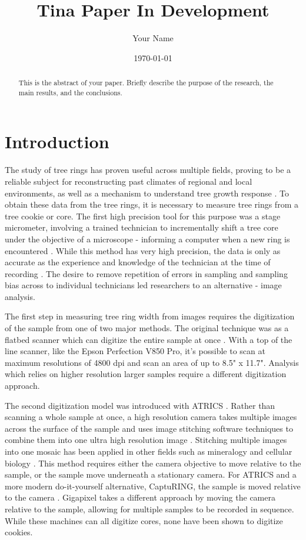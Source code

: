 \documentclass[a4paper,12pt]{article}
\title{Tina Paper In Development}
\author{Your Name}
\date{\today}
\begin{document}
\maketitle

\begin{abstract}
    This is the abstract of your paper. Briefly describe the purpose of the research, the main results, and the conclusions.
\end{abstract}

\section{Introduction}
The study of tree rings has proven useful across multiple fields, proving to be a reliable subject for reconstructing past climates of regional and local environments, as well as a mechanism to understand tree growth response \citep{fritts_dendroclimatology_1971} \citep{williams_using_2010} \citep{guibal_dendrochronology_2021} \citep{sheppard_dendroclimatology_2010}.
To obtain these data from the tree rings, it is necessary to measure tree rings from a tree cookie or core. The first high precision tool for this purpose was a stage micrometer, involving a trained technician to incrementally shift a tree core under the objective of a microscope - informing a computer when a new ring is encountered \citep{robinson_microcomputer_nodate}.
While this method has very high precision, the data is only as accurate as the experience and knowledge of the technician at the time of recording \citep{levanic_atrics_2007}.
The desire to remove repetition of errors in sampling and sampling bias across to individual technicians led researchers to an alternative - image analysis. 

The first step in measuring tree ring width from images requires the digitization of the sample from one of two major methods.  
The original technique was as a flatbed scanner which can digitize the entire sample at once \citep{guay_new_1992}. 
With a top of the line scanner, like the Epson Perfection V850 Pro, it's possible to scan at maximum resolutions of 4800 dpi and scan an area of up to 8.5" x 11.7".
Analysis which relies on higher resolution larger samples require a different digitization approach. 

The second digitization model was introduced with ATRICS \citep{levanic_atrics_2007}. 
Rather than scanning a whole sample at once, a high resolution camera takes multiple images across the surface of the sample and uses image stitching software techniques to combine them into one ultra high resolution image \citep{muhlich_stitching_2022}.
Stitching multiple images into one mosaic has been applied in other fields such as mineralogy and cellular biology \citep{ro_image_2021,mohammadi_fast_2024}. 
This method requires either the camera objective to move relative to the sample, or the sample move underneath a stationary camera. 
For ATRICS and a more modern do-it-yourself alternative, CaptuRING, the sample is moved relative to the camera \citep{garcia-hidalgo_capturing_2022}. 
Gigapixel takes a different approach by moving the camera relative to the sample, allowing for multiple samples to be recorded in sequence. 
While these machines can all digitize cores, none have been shown to digitize cookies.
\end{document}
